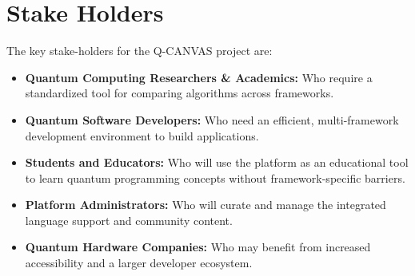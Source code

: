 \section{Stake Holders}
The key stake-holders for the Q-CANVAS project are:
\begin{itemize}
    \item \textbf{Quantum Computing Researchers \& Academics:} Who require a standardized tool for comparing algorithms across frameworks.
    \item \textbf{Quantum Software Developers:} Who need an efficient, multi-framework development environment to build applications.
    \item \textbf{Students and Educators:} Who will use the platform as an educational tool to learn quantum programming concepts without framework-specific barriers.
    \item \textbf{Platform Administrators:} Who will curate and manage the integrated language support and community content.
    \item \textbf{Quantum Hardware Companies:} Who may benefit from increased accessibility and a larger developer ecosystem.
\end{itemize}
